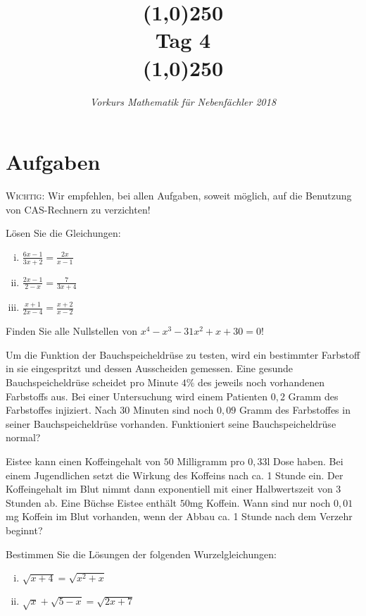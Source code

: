 \documentclass[11pt]{article}
\begin{document}
\title{\line(1,0){250}\\Tag 4\\\line(1,0){250}}
\date{}
\author{\itshape Vorkurs Mathematik für Nebenfächler 2018}
\maketitle
\section*{Aufgaben}
\textsc{Wichtig:} Wir empfehlen, bei allen Aufgaben, soweit möglich, auf die Benutzung von CAS-Rechnern zu verzichten!
\begin{task}
	Lösen Sie die Gleichungen:
	\begin{enumerate}[i)]
		\item $\frac{6x-1}{3x+2} = \frac{2x}{x-1}$
		\item $\frac{2x-1}{2-x} = \frac{7}{3x+4}$
		\item $\frac{x+1}{2x-4} = \frac{x+2}{x-2}$
	\end{enumerate}
\end{task}
\begin{task}
	Finden Sie alle Nullstellen von $x^4-x^3-31x^2+x+30=0$!
\end{task}
\dotfill
\begin{task}
	Um die Funktion der Bauchspeicheldr\"use zu testen, wird ein bestimmter Farbstoff in sie eingespritzt und dessen Ausscheiden gemessen. Eine gesunde Bauchspeicheldr\"use
	scheidet pro Minute $4 \%$ des jeweils noch vorhandenen Farbstoffs aus. Bei einer Untersuchung wird einem Patienten $0,2$ Gramm des Farbstoffes injiziert. Nach
	$30$ Minuten sind noch $0,09$ Gramm des Farbstoffes in seiner Bauchspeicheldr\"use vorhanden. Funktioniert seine Bauchspeicheldr\"use normal?
\end{task}
\begin{task}
	Eistee kann einen Koffeingehalt von $50$ Milligramm pro $0,33$l Dose haben. Bei einem Jugendlichen setzt die Wirkung des Koffeins nach ca. 1 Stunde ein. Der Koffeingehalt im Blut nimmt dann exponentiell
	mit einer Halbwertszeit von $3$ Stunden ab. Eine B\"uchse Eistee enth\"alt $50$mg Koffein. Wann sind nur noch $0,01$mg Koffein im Blut vorhanden, wenn der Abbau ca. 1 Stunde nach dem Verzehr beginnt?
\end{task}
\dotfill
\begin{task}
Bestimmen Sie die L\"osungen der folgenden Wurzelgleichungen: 
\begin{enumerate}[i)]
	\item $\sqrt{x+4}=\sqrt{x^2+x}$
	\item $\sqrt{x}+\sqrt{5-x}=\sqrt{2x+7}$
\end{enumerate}  
\end{task}
\end{document}
